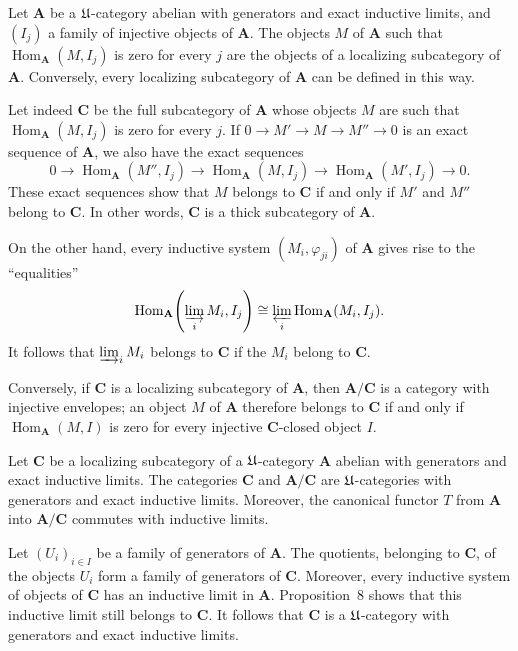 \begin{unnumberedcorollary}
Let $\mathbf{A}$ be a $\mathfrak{U}$-category abelian with generators and
exact inductive limits, and $(I_j)$ a family of injective objects of
$\mathbf{A}$. The objects $M$ of $\mathbf{A}$ such that
$\operatorname{Hom}_{\mathbf{A}}(M,I_j)$ is zero for every $j$ are the
objects of a localizing subcategory of $\mathbf{A}$. Conversely, every
localizing subcategory of $\mathbf{A}$ can be defined in this way.
\end{unnumberedcorollary}

Let indeed $\mathbf{C}$ be the full subcategory of $\mathbf{A}$ whose
objects $M$ are such that $\operatorname{Hom}_{\mathbf{A}}(M,I_j)$ is
zero for every $j$. If $0\to M'\to M\to M''\to0$ is an exact
sequence of $\mathbf{A}$, we also have the exact sequences
\[
0\to\operatorname{Hom}_{\mathbf{A}}(M'',I_j)
\to\operatorname{Hom}_{\mathbf{A}}(M,I_j)
\to\operatorname{Hom}_{\mathbf{A}}(M',I_j)\to0.
\]
These exact sequences show that $M$ belongs to $\mathbf{C}$ if and
only if $M'$ and $M''$ belong to $\mathbf{C}$. In other words,
$\mathbf{C}$ is a thick subcategory of $\mathbf{A}$.

On the other hand, every inductive system $(M_i,\varphi_{ji})$ of
$\mathbf{A}$ gives rise to the ``equalities''
\[
\operatorname{Hom}_{\mathbf{A}}\!\left(\varinjlim_i M_i,I_j\right)
\cong \varprojlim_i\operatorname{Hom}_{\mathbf{A}}(M_i,I_j).
\]
It follows that $\varinjlim_i M_i$ belongs to $\mathbf{C}$ if the
$M_i$ belong to $\mathbf{C}$.

Conversely, if $\mathbf{C}$ is a localizing subcategory of
$\mathbf{A}$, then $\mathbf{A}/\mathbf{C}$ is a category with
injective envelopes; an object $M$ of $\mathbf{A}$ therefore belongs
to $\mathbf{C}$ if and only if $\operatorname{Hom}_{\mathbf{A}}(M,I)$
is zero for every injective $\mathbf{C}$-closed object $I$.

\begin{proposition}
Let $\mathbf{C}$ be a localizing subcategory of a $\mathfrak{U}$-category
$\mathbf{A}$ abelian with generators and exact inductive limits. The
categories $\mathbf{C}$ and $\mathbf{A}/\mathbf{C}$ are
$\mathfrak{U}$-categories with generators and exact inductive limits. Moreover,
the canonical functor $T$ from $\mathbf{A}$ into
$\mathbf{A}/\mathbf{C}$ commutes with inductive limits.
\end{proposition}

Let $(U_i)_{i\in I}$ be a family of generators of $\mathbf{A}$. The
quotients, belonging to $\mathbf{C}$, of the objects $U_i$ form a
family of generators of $\mathbf{C}$. Moreover, every inductive system
of objects of $\mathbf{C}$ has an inductive limit in $\mathbf{A}$.
Proposition~8 shows that this inductive limit still belongs to
$\mathbf{C}$. It follows that $\mathbf{C}$ is a $\mathfrak{U}$-category with
generators and exact inductive limits.

